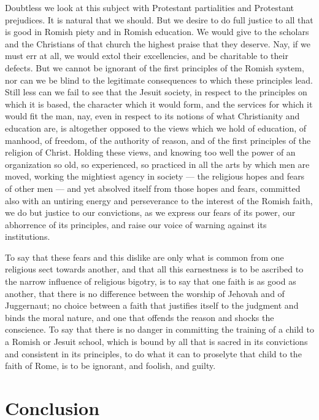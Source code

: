\documentclass[]{book}
\begin{document}
Doubtless we look at this subject with Protestant partialities and Protestant prejudices. It is natural that we should. But we desire to do full justice to all that is good in Romish piety and in Romish education. We would give to the scholars and the Christians of that church the highest praise that they deserve. Nay, if we must err at all, we would extol their excellencies, and be charitable to their defects. But we cannot be ignorant of the first principles of the Romish system, nor can we be blind to the legitimate consequences to which these principles lead. Still less can we fail to see that the Jesuit society, in respect to the principles on which it is based, the character which it would form, and the services for which it would fit the man, nay, even in respect to its notions of what Christianity and education are, is altogether opposed to the views which we hold of education, of manhood, of freedom, of the authority of reason, and of the first principles of the religion of Christ. Holding these views, and knowing too well the power of an organization so old, so experienced, so practiced in all the arts by which men are moved, working the mightiest agency in society --- the religious hopes and fears of other men --- and yet absolved itself from those hopes and fears, committed also with an untiring energy and perseverance to the interest of the Romish faith, we do but justice to our convictions, as we express our fears of its power, our abhorrence of its principles, and raise our voice of warning against its institutions.

To say that these fears and this dislike are only what is common from one religious sect towards another, and that all this earnestness is to be ascribed to the narrow influence of religious bigotry, is to say that one faith is as good as another, that there is no difference between the worship of Jehovah and of Juggernaut; no choice between a faith that justifies itself to the judgment and binds the moral nature, and one that offends the reason and shocks the conscience. To say that there is no danger in committing the training of a child to a Romish or Jesuit school, which is bound by all that is sacred in its convictions and consistent in its principles, to do what it can to proselyte that child to the faith of Rome, is to be ignorant, and foolish, and guilty.

\hypertarget{conclusion}{%
\chapter{Conclusion}\label{conclusion}}
\end{document}
